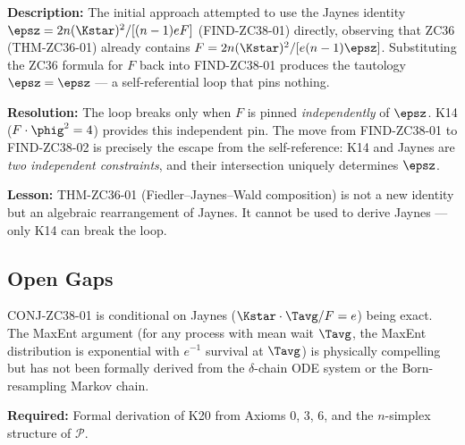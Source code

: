 \documentclass[12pt, a4paper]{article}
\begin{document}
\begin{openqbox}[title={PM-ZC38-01: Self-Referential Trap in First Attempt}]
\textbf{Description:}
The initial approach attempted to use the Jaynes identity
$\epsz = 2n(\Kstar)^2 / [(n-1)eF]$ (FIND-ZC38-01) directly,
observing that ZC36 (THM-ZC36-01) already contains
$F = 2n(\Kstar)^2 / [e(n-1)\epsz]$.
Substituting the ZC36 formula for $F$ back into FIND-ZC38-01
produces the tautology $\epsz = \epsz$ --- a self-referential loop
that pins nothing.

\textbf{Resolution:}
The loop breaks only when $F$ is pinned \emph{independently} of $\epsz$.
K14 ($F \cdot \phig^2 = 4$) provides this independent pin.
The move from FIND-ZC38-01 to FIND-ZC38-02 is precisely the
escape from the self-reference: K14 and Jaynes are \emph{two
independent constraints}, and their intersection uniquely determines $\epsz$.

\textbf{Lesson:}
THM-ZC36-01 (Fiedler--Jaynes--Wald composition) is not a new identity
but an algebraic rearrangement of Jaynes.
It cannot be used to derive Jaynes --- only K14 can break the loop.
\end{openqbox}

\subsection{Open Gaps}
\label{sec:gaps2}

\begin{openqbox}[title={GAP-ZC38-01: Formal Proof of Jaynes Identity from $\delta$-Chain Axioms}]
CONJ-ZC38-01 is conditional on Jaynes ($\Kstar \cdot \Tavg / F = e$)
being exact. The MaxEnt argument (for any process with mean wait $\Tavg$,
the MaxEnt distribution is exponential with $e^{-1}$ survival at $\Tavg$)
is physically compelling but has not been formally derived from the
$\delta$-chain ODE system or the Born-resampling Markov chain.

\textbf{Required:} Formal derivation of K20 from Axioms 0, 3, 6,
and the $n$-simplex structure of $\mathcal{P}$.
\end{openqbox}
\end{document}
